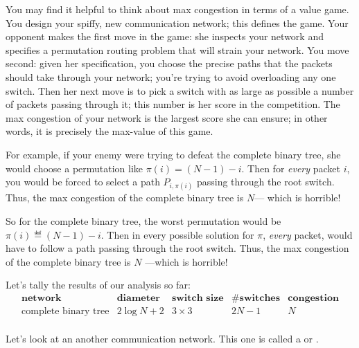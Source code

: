 \begin{editingnotes}

You may find it helpful to think about max congestion in terms of a value
game.  You design your spiffy, new communication network; this defines the
game.  Your opponent makes the first move in the game: she inspects your
network and specifies a permutation routing problem that will strain your
network.\iffalse
That is, her first move is a specification of which input terminals must
send a packet to which output terminals.
\fi
You move second: given her specification, you choose the precise paths
that the packets should take through your network; you're trying to avoid
overloading any one switch.  Then her next move is to pick a switch with
as large as possible a number of packets passing through it; this number
is her score in the competition.  The max congestion of your network is
the largest score she can ensure; in other words, it is precisely the
max-value of this game.

For example, if your enemy were trying to defeat the complete binary
tree, she would choose a permutation like $\pi(i) = (N - 1) - i$.
Then for \textit{every} packet $i$, you would be forced to select a
path $P_{i, \pi(i)}$ passing through the root switch.  Thus, the max
congestion of the complete binary tree is $N$--- which is horrible!

\end{editingnotes}

So for the complete binary tree, the worst permutation would be $\pi(i)
\eqdef (N - 1) - i$.  Then in every possible solution for $\pi$,
\textit{every} packet, would have to follow a path passing through the
root switch.  Thus, the max congestion of the complete binary tree is $N$
---which is horrible!

Let's tally the results of our analysis so far:
%
\[
\begin{array}{r|c|c|c|c}
\textbf{network} &
\textbf{diameter} &
\textbf{switch size} &
\textbf{\# switches} &
\textbf{congestion} \\ \hline
\text{complete binary tree} & 2 \log N + 2 & 3 \times 3 & 2N - 1 & N \\
\end{array}
\]

\label{2Darray}

Let's look at an another communication network.  This one is called a
 or .

